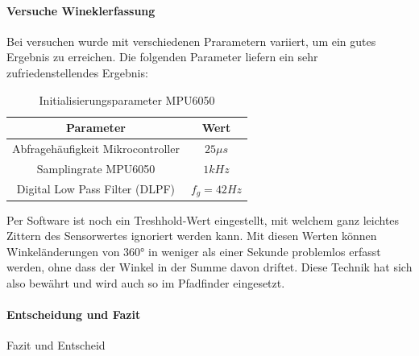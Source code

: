 \documentclass[main.tex]{subfiles} %
\begin{document}
\paragraph{Versuche Wineklerfassung}
Bei versuchen wurde mit verschiedenen Prarametern variiert, um ein gutes
Ergebnis zu erreichen. Die folgenden Parameter liefern ein sehr
zufriedenstellendes Ergebnis:

\begin{table}[h]                                    %
    \centering
    \begin{tabular}{|c|c|}                        %
        \hline
        Parameter                         & Wert         \\ \hline
        Abfragehäufigkeit Mikrocontroller & $25 \mu s$   \\ \hline
        Samplingrate MPU6050              & $1 kHz$      \\ \hline
        Digital Low Pass Filter (DLPF)    & $f_g = 42Hz$ \\ \hline
    \end{tabular}
    \caption{Initialisierungsparameter MPU6050}
    \label{tab:params_mpu6050}
\end{table}

Per Software ist noch ein Treshhold-Wert eingestellt, mit welchem ganz leichtes
Zittern des Sensorwertes ignoriert werden kann. Mit diesen Werten können
Winkeländerungen von 360° in weniger als einer Sekunde problemlos erfasst
werden, ohne dass der Winkel in der Summe davon driftet. Diese Technik hat sich
also bewährt und wird auch so im Pfadfinder eingesetzt.

\paragraph{Entscheidung und Fazit}
Fazit und Entscheid
\end{document}
